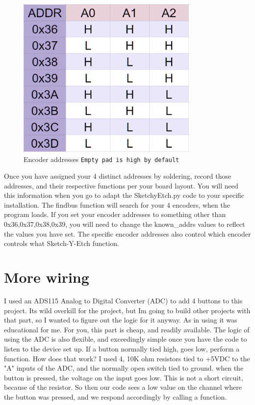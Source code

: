 \documentclass[]{article}
\begin{document}
\begin{figure}[ht]
	\centering
	\includegraphics[width=0.8\textwidth]{rotaryEncTable.png}
	\caption{Encoder addresses \texttt{Empty pad is high by default} }
	\label{fig:address asignments}
	\end{figure}

Once you have assigned your 4 distinct addresses by soldering, record those addresses, and their respective functions per your board layout. You will need this information when you go to adapt the SketchyEtch.py code to your specific installation.
The findbus function will search for your 4 encoders, when the program loads. If you set your encoder addresses to something other than 0x36,0x37,0x38,0x39, you will need to change the known\_addrs values to reflect the values you have set. 
The specific encoder addresses also control which encoder controls what Sketch-Y-Etch function. 


\section*{More wiring} I used an ADS115 Analog to Digital Converter (ADC) to add 4 buttons to this project. Its wild overkill for the project, but Im going to build other projects with that part, so I wanted to figure out the logic for it anyway.
As in using it was educational for me. For you, this part is cheap, and readily available. The logic of using the ADC is also flexible, and exceedingly simple once you have the code to listen to the device set up. If a button normally tied high, goes low, perform a function. 
How does that work? I used 4, 10K ohm resistors tied to +5VDC to the "A" inputs of the ADC, and the normally open switch tied to ground. when the button is pressed, the voltage on the input goes low. This is not a short circuit, because of the resistor. So then our code sees a low value on the channel where the button was pressed, and we respond accordingly by calling a function.  
\end{document}
